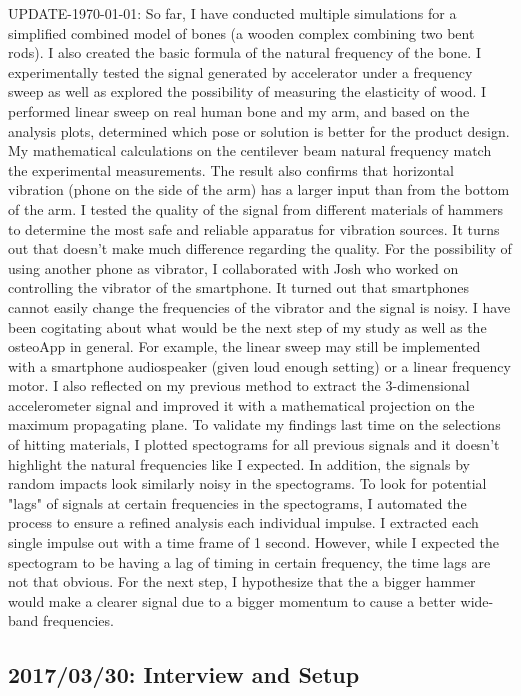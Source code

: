 \documentclass{sigchi}
\begin{document}
UPDATE-\today: So far, I have conducted multiple simulations for a simplified combined model of bones (a wooden complex combining two bent rods). I also created the basic formula of the natural frequency of the bone. I experimentally tested the signal generated by accelerator under a frequency sweep as well as explored the possibility of measuring the elasticity of wood. I performed linear sweep on real human bone and my arm, and based on the analysis plots, determined which pose or solution is better for the product design. My mathematical calculations on the centilever beam natural frequency match the experimental measurements. The result also confirms that horizontal vibration (phone on the side of the arm) has a larger input than from the bottom of the arm. I tested the quality of the signal from different materials of hammers to determine the most safe and reliable apparatus for vibration sources. It turns out that doesn't make much difference regarding the quality. For the possibility of using another phone as vibrator, I collaborated with Josh who worked on controlling the vibrator of the smartphone. It turned out that smartphones cannot easily change the frequencies of the vibrator and the signal is noisy. I have been cogitating about what would be the next step of my study as well as the osteoApp in general. For example, the linear sweep may still be implemented with a smartphone audiospeaker (given loud enough setting) or a linear frequency motor. I also reflected on my previous method to extract the 3-dimensional accelerometer signal and improved it with a mathematical projection on the maximum propagating plane. To validate my findings last time on the selections of hitting materials, I plotted spectograms for all previous signals and it doesn't highlight the natural frequencies like I expected. In addition, the signals by random impacts look similarly noisy in the spectograms. To look for potential "lags" of signals at certain frequencies in the spectograms, I automated the process to ensure a refined analysis each individual impulse. I extracted each single impulse out with a time frame of 1 second. However, while I expected the spectogram to be having a lag of timing in certain frequency, the time lags are not that obvious. For the next step, I hypothesize that the a bigger hammer would make a clearer signal due to a bigger momentum to cause a better wide-band frequencies.

\subsection{2017/03/30: Interview and Setup}
\end{document}
